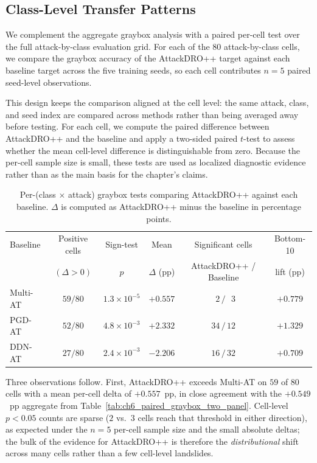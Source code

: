 \subsection{Class-Level Transfer Patterns}
\label{subsec:ch6_class_level_transfer_patterns}

We complement the aggregate graybox analysis with a paired per-cell test over the
full attack-by-class evaluation grid. For each of the 80 attack-by-class cells,
we compare the graybox accuracy of the AttackDRO++ target against each baseline
target across the five training seeds, so each cell contributes \(n=5\) paired
seed-level observations. 

This design keeps the comparison aligned at the cell
level: the same attack, class, and seed index are compared across methods rather
than being averaged away before testing. For each cell, we compute the paired
difference between AttackDRO++ and the baseline and apply a two-sided paired
\(t\)-test to assess whether the mean cell-level difference is distinguishable
from zero. Because the per-cell sample size is small, these tests are used as
localized diagnostic evidence rather than as the main basis for the chapter's
claims.

\begin{table}[H]
\centering
\caption[Graybox class-attack tests]{Per-(class \(\times\) attack) graybox tests comparing
AttackDRO++ against each baseline. \(\Delta\) is computed as
AttackDRO++ minus the baseline in percentage points.}
\label{tab:ch6_graybox_per_cell}
\footnotesize
\setlength{\tabcolsep}{4.5pt}
\renewcommand{\arraystretch}{1.18}
\begin{tabular}{lccccc}
\toprule
Baseline
& Positive cells
& Sign-test
& Mean
& Significant cells
& Bottom-10 \\
& \((\Delta>0)\)
& \(p\)
& \(\Delta\) (pp)
& AttackDRO++ / Baseline
& lift (pp) \\
\midrule
Multi-AT
& $59/80$
& $1.3{\times}10^{-5}$
& $+0.557$
& $\phantom{0}2 \,/\, \phantom{0}3$
& $+0.779$ \\

PGD-AT
& $52/80$
& $4.8{\times}10^{-3}$
& $+2.332$
& $34 \,/\, 12$
& $+1.329$ \\

DDN-AT
& $27/80$
& $2.4{\times}10^{-3}$
& $-2.206$
& $16 \,/\, 32$
& $+0.709$ \\
\bottomrule
\end{tabular}
\end{table}

Three observations follow. First, AttackDRO++ exceeds Multi-AT on
$59$ of $80$ cells with a mean per-cell delta of $+0.557$~pp, in close
agreement with the $+0.549$~pp aggregate from
Table~\ref{tab:ch6_paired_graybox_two_panel}. Cell-level \(p<0.05\) counts are sparse
($2$ vs.\ $3$ cells reach that threshold in either direction), as expected
under the $n = 5$ per-cell sample size and the small absolute deltas;
the bulk of the evidence for AttackDRO++ is therefore the
\emph{distributional} shift across many cells rather than a few cell-level
landslides.


